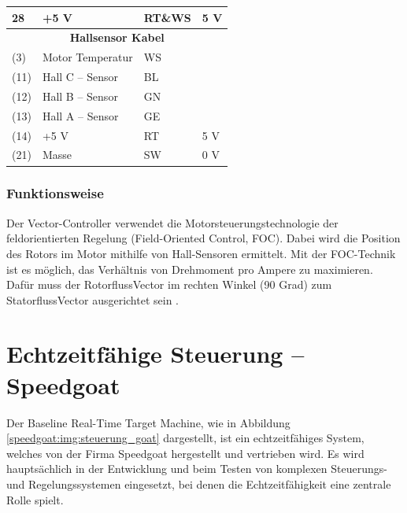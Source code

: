 \begin{table}[!ht]
\begin{tabular}{lll|l}
		\multicolumn{1}{l|}{28}   & +5 V                    & RT\&WS         & 5 V             \\ \hline
		\multicolumn{4}{c}{\textbf{Hallsensor Kabel}}                                          \\ \hline
		\multicolumn{1}{l|}{(3)}  & Motor Temperatur        & WS             &                 \\
		\multicolumn{1}{l|}{(11)} & Hall C – Sensor         & BL             &                 \\
		\multicolumn{1}{l|}{(12)} & Hall B – Sensor         & GN             &                 \\
		\multicolumn{1}{l|}{(13)} & Hall A – Sensor         & GE             &                 \\
		\multicolumn{1}{l|}{(14)} & +5 V                    & RT             & 5 V             \\
		\multicolumn{1}{l|}{(21)} & Masse                   & SW             & 0 V             \\ \hline
	\end{tabular}
\end{table}
\pagebreak[4]

\subsubsection*{Funktionsweise}
\label{Vector_Controller:Funktionsweise}
Der Vector-Controller verwendet die Motorsteuerungstechnologie der feldorientierten Regelung (Field-Oriented Control, FOC). Dabei wird die Position des Rotors im Motor mithilfe von Hall-Sensoren ermittelt. Mit der FOC-Technik ist es möglich, das Verhältnis von Drehmoment pro Ampere zu maximieren. Dafür muss der RotorflussVector im rechten Winkel (90 Grad) zum StatorflussVector ausgerichtet sein \cite{Golden_Motor:Vector_Controller}.


\newpage


\section{Echtzeitfähige Steuerung – Speedgoat}
\label{section:speedgoat}


Der Baseline Real-Time Target Machine, wie in Abbildung \ref{speedgoat:img:steuerung_goat} dargestellt, ist ein echtzeitfähiges System, welches von der Firma Speedgoat hergestellt und vertrieben wird. Es wird hauptsächlich in der Entwicklung und beim Testen von komplexen Steuerungs- und Regelungssystemen eingesetzt, bei denen die Echtzeitfähigkeit eine zentrale Rolle spielt.\\ \ \\


